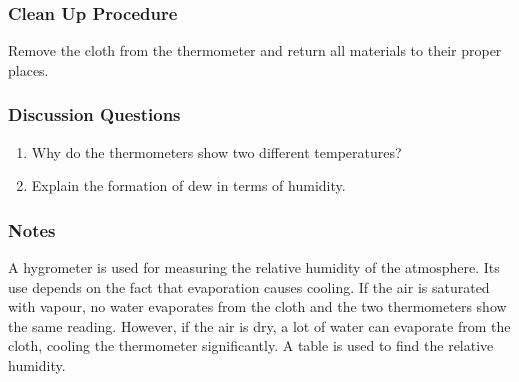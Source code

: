 \subsubsection*{Clean Up Procedure}
Remove the cloth from the thermometer and return all materials to their proper places.

\subsubsection*{Discussion Questions}
\begin{enumerate}
\item{Why do the thermometers show two different temperatures?}
\item{Explain the formation of dew in terms of humidity.}
\end{enumerate}

\subsubsection*{Notes}
A hygrometer is used for measuring the relative humidity of the atmosphere.  Its use depends on the fact that evaporation causes cooling.  If the air is saturated with vapour, no water evaporates from the cloth and the two thermometers show the same reading.  However, if the air is dry, a lot of water can evaporate from the cloth, cooling the thermometer significantly.  A table is used to find the relative humidity.
